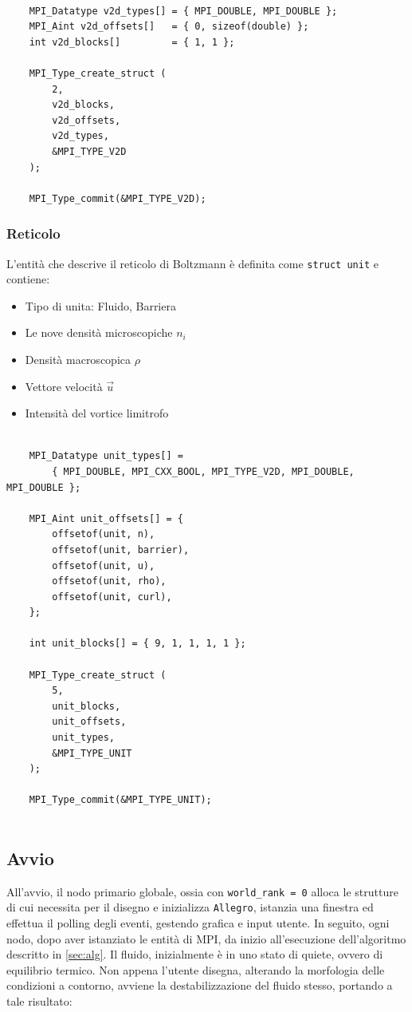 \documentclass[12pt]{article}
\begin{document}
\begin{lstlisting}

    MPI_Datatype v2d_types[] = { MPI_DOUBLE, MPI_DOUBLE };
    MPI_Aint v2d_offsets[]   = { 0, sizeof(double) };
    int v2d_blocks[]         = { 1, 1 };

    MPI_Type_create_struct (
        2, 
        v2d_blocks, 
        v2d_offsets, 
        v2d_types, 
        &MPI_TYPE_V2D
    );
    
    MPI_Type_commit(&MPI_TYPE_V2D);

\end{lstlisting}

\subsubsection{Reticolo}
L'entità che descrive il reticolo di Boltzmann è definita come \verb|struct unit| e contiene:
\begin{itemize}
    \item Tipo di unita: Fluido, Barriera
    \item Le nove densità microscopiche \(n_i\)
    \item Densità macroscopica \(\rho\)
    \item Vettore velocità \(\vec{u}\)
    \item Intensità del vortice limitrofo
\end{itemize}

\begin{lstlisting}

    MPI_Datatype unit_types[] =
        { MPI_DOUBLE, MPI_CXX_BOOL, MPI_TYPE_V2D, MPI_DOUBLE, MPI_DOUBLE };
        
    MPI_Aint unit_offsets[] = {
        offsetof(unit, n),
        offsetof(unit, barrier),
        offsetof(unit, u),
        offsetof(unit, rho),
        offsetof(unit, curl),
    };

    int unit_blocks[] = { 9, 1, 1, 1, 1 };

    MPI_Type_create_struct (
        5, 
        unit_blocks, 
        unit_offsets, 
        unit_types, 
        &MPI_TYPE_UNIT
    );
    
    MPI_Type_commit(&MPI_TYPE_UNIT);
    
\end{lstlisting}



\subsection{Avvio}
All'avvio, il nodo primario globale, ossia con \verb|world_rank = 0| alloca le strutture di cui necessita per il disegno e inizializza \verb|Allegro|, istanzia una finestra ed effettua il polling degli eventi, gestendo grafica e input utente.
In seguito, ogni nodo, dopo aver istanziato le entità di MPI, da inizio all'esecuzione dell'algoritmo descritto in \ref{sec:alg}.
Il fluido, inizialmente è in uno stato di quiete, ovvero di equilibrio termico. Non appena l'utente disegna, alterando la morfologia delle condizioni a contorno, avviene la destabilizzazione del fluido stesso, portando a tale risultato:
\end{document}
